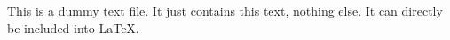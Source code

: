 This is a dummy text file.
It just contains this text, nothing else.
It can directly be included into \LaTeX.
